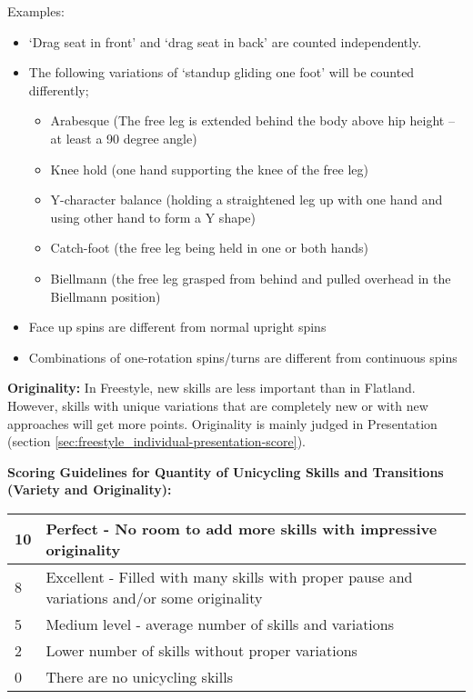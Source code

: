 Examples:
\begin{itemize}
\item `Drag seat in front' and `drag seat in back' are counted independently.
\item The following variations of `standup gliding one foot' will be counted differently;
	\begin{itemize}
 	\item Arabesque (The free leg is extended behind the body above hip height – at least a 90 degree angle)
	\item Knee hold (one hand supporting the knee of the free leg)
	\item Y-character balance (holding a straightened leg up with one hand and using other hand to form a Y shape)
	\item Catch-foot (the free leg being held in one or both hands)
	\item Biellmann (the free leg grasped from behind and pulled overhead in the Biellmann position) 
	\end{itemize}
\item Face up spins are different from normal upright spins 
\item Combinations of one-rotation spins/turns are different from continuous spins
\end{itemize}

\textbf{Originality:} In Freestyle, new skills are less important than in Flatland.
However, skills with unique variations that are completely new or with new approaches will get more points.
Originality is mainly judged in Presentation (section \ref{sec:freestyle_individual-presentation-score}).

\begin{minipage}{\textwidth}
\textbf{Scoring Guidelines for Quantity of Unicycling Skills and Transitions (Variety and Originality):} \\

\begin{tabular}{|l|p{12.5cm}|}
\hline
10 & Perfect - No room to add more skills with impressive originality \\
\hline
8 & Excellent - Filled with many skills with proper pause and variations and/or some originality \\
\hline
5 & Medium level - average number of skills and variations \\
\hline
2 & Lower number of skills without proper variations \\
\hline
0 & There are no unicycling skills \\
\hline
\end{tabular}
\end{minipage}

